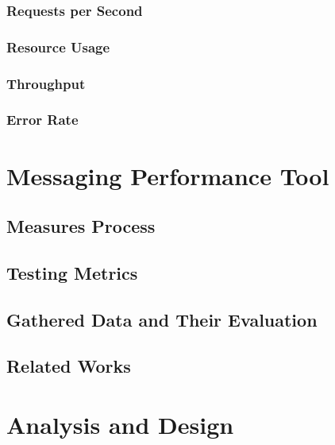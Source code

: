 \subsection{Requests per Second}

\subsection{Resource Usage}

\subsection{Throughput}

\subsection{Error Rate}

\chapter{Messaging Performance Tool}
\label{Messaging Performance Tool}

\section{Measures Process}
\label{Measures Process}

\section{Testing Metrics}
\label{Testing Metrics}

\section{Gathered Data and Their Evaluation}
\label{Gathered Data and Their Evaluation}

\section{Related Works}
\label{Related Works}

\chapter{Analysis and Design}
\label{Analysis and Design}

